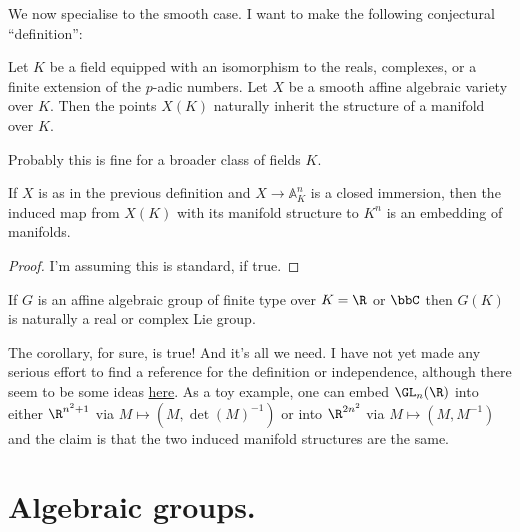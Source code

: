 We now specialise to the smooth case. I want to make the following conjectural ``definition'':

\begin{definition}\label{manifold_on_algebraic_variety_points}\notready Let $K$ be a field equipped with an isomorphism to the reals, complexes, or a finite extension of the $p$-adic numbers. Let $X$ be a smooth affine algebraic variety over $K$. Then the points $X(K)$ naturally inherit the structure of a manifold over $K$.
\end{definition}

\begin{remark} Probably this is fine for a broader class of fields $K$.
\end{remark}

\begin{theorem}\label{manifold_on_algebraic_variety_computation}\notready
    If $X$ is as in the previous definition and $X\to\mathbb{A}^n_K$ is a closed immersion, then the induced map from $X(K)$ with its manifold structure to $K^n$ is an embedding of manifolds.
\end{theorem}
\begin{proof} I'm assuming this is standard, if true.
\end{proof}
\begin{corollary}\label{lie_group_from_algebraic_group}\notready
    If $G$ is an affine algebraic group of finite type over $K=\R$ or $\bbC$ then $G(K)$ is naturally a real or complex Lie group.
\end{corollary}
\begin{remark}

    The corollary, for sure, is true! And it's all we need. I have not yet made any serious effort to find a reference for the definition or independence, although there seem to be some ideas \href{https://leanprover.zulipchat.com/#narrow/stream/116395-maths/topic/top.20space.20.2F.20manifold.20structure.20on.20points.20of.20alg.20varieties/near/431812525}{here}. As a toy example, one can embed $\GL_n(\R)$ into either $\R^{n^2+1}$ via $M\mapsto (M,\det(M)^{-1})$ or into $\R^{2n^2}$ via $M\mapsto (M,M^{-1})$ and the claim is that the two induced manifold structures are the same.
\end{remark}
\section{Algebraic groups.}

